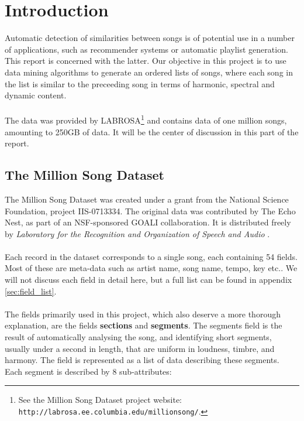 
\section{Introduction} %
\label{sec:introduction}
Automatic detection of similarities between songs is of potential use in a number of applications, such as recommender systems or automatic playlist generation. This report is concerned with the latter. Our objective in this project is to use data mining algorithms to generate an ordered lists of songs, where each song in the list is similar to the preceeding song in terms of harmonic, spectral and dynamic content.
\\\\
The data was provided by LABROSA\footnote{See the Million Song Dataset project website: \texttt{http://labrosa.ee.columbia.edu/millionsong/}.} and contains data of one million songs, amounting to 250GB of data. It will be the center of discussion in this part of the report.
\subsection{The Million Song Dataset} %
\label{sub:the_million_song_dataset}
The Million Song Dataset was created under a grant from the National Science Foundation, project IIS-0713334. The original data was contributed by The Echo Nest, as part of an NSF-sponsored GOALI collaboration. It is distributed freely by \textit{Laboratory for the Recognition and Organization of Speech and Audio} \citep{bert11}.
\\\\
Each record in the dataset corresponds to a single song, each containing 54 fields. Most of these are meta-data such as artist name, song name, tempo, key etc.. We will not discuss each field in detail here, but a full list can be found in appendix \ref{sec:field_list}.
\\\\
The fields primarily used in this project, which also deserve a more thorough explanation, are the fields \textbf{sections} and \textbf{segments}. The segments field is the result of automatically analysing the song, and identifying short segments, usually under a second in length, that are uniform in loudness, timbre, and harmony. The field is represented as a list of data describing these segments. Each segment is described by 8 sub-attributes:

